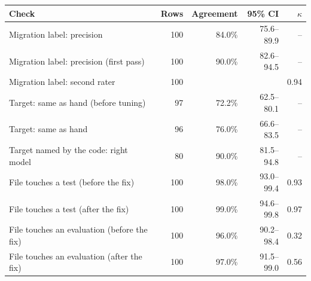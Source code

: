 \begin{tabular}{lrrrr}
\toprule
Check & Rows & Agreement & 95\% CI & $\kappa$ \\
\midrule
Migration label: precision & 100 & 84.0\% & 75.6--89.9 & -- \\
Migration label: precision (first pass) & 100 & 90.0\% & 82.6--94.5 & -- \\
Migration label: second rater & 100 & & & 0.94 \\
\midrule
Target: same as hand (before tuning) & 97 & 72.2\% & 62.5--80.1 & -- \\
Target: same as hand & 96 & 76.0\% & 66.6--83.5 & -- \\
Target named by the code: right model & 80 & 90.0\% & 81.5--94.8 & -- \\
\midrule
File touches a test (before the fix) & 100 & 98.0\% & 93.0--99.4 & 0.93 \\
File touches a test (after the fix) & 100 & 99.0\% & 94.6--99.8 & 0.97 \\
File touches an evaluation (before the fix) & 100 & 96.0\% & 90.2--98.4 & 0.32 \\
File touches an evaluation (after the fix) & 100 & 97.0\% & 91.5--99.0 & 0.56 \\
\bottomrule
\end{tabular}
